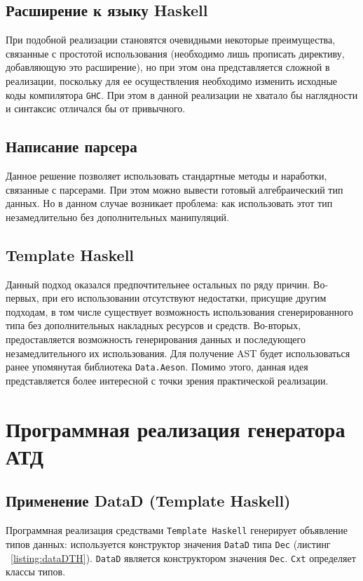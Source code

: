 \subsection{Расширение к языку Haskell}

При подобной реализации становятся очевидными некоторые преимущества, связанные с простотой использования (необходимо лишь прописать директиву, добавляющую это расширение), но при этом она представляется сложной в реализации, поскольку для ее осуществления необходимо изменить исходные коды компилятора  \lstinline{GHC}. При этом в данной реализации не хватало бы наглядности и синтаксис отличался бы от привычного.

\subsection{Написание парсера}
Данное решение позволяет использовать стандартные методы и наработки, связанные с парсерами. При этом можно вывести готовый алгебраический тип данных. Но в данном случае возникает проблема: как использовать этот тип незамедлительно без дополнительных манипуляций.   	

\subsection{Template Haskell}
Данный подход оказался предпочтительнее остальных по ряду причин. Во-первых, при его использовании отсутствуют недостатки, присущие другим подходам, в том числе существует возможность использования сгенерированного типа без дополнительных накладных ресурсов и средств. Во-вторых, предоставляется возможность генерирования данных  и последующего незамедлительного их использования. Для получение AST будет использоваться ранее упомянутая библиотека \lstinline{Data.Aeson}. Помимо этого, данная идея представляется более интересной с точки зрения практической реализации. 

\section{Программная реализация генератора АТД}

\subsection{Применение DataD (Template Haskell)}

Программная реализация средствами \lstinline{Template Haskell} генерирует объявление типов данных: используется конструктор значения \lstinline{DataD} типа \lstinline{Dec} (листинг ~\ref{listing:dataDTH}). \lstinline{DataD} является конструктором значения \lstinline{Dec}. \lstinline{Cxt} определяет классы типов. 

